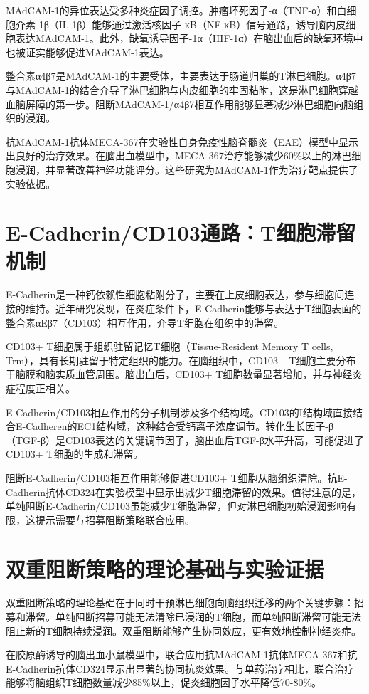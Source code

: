 \documentclass[12pt,a4paper]{article}
\begin{document}
MAdCAM-1的异位表达受多种炎症因子调控。肿瘤坏死因子-α（TNF-α）和白细胞介素-1β（IL-1β）能够通过激活核因子-κB（NF-κB）信号通路，诱导脑内皮细胞表达MAdCAM-1。此外，缺氧诱导因子-1α（HIF-1α）在脑出血后的缺氧环境中也被证实能够促进MAdCAM-1表达。

整合素α4β7是MAdCAM-1的主要受体，主要表达于肠道归巢的T淋巴细胞。α4β7与MAdCAM-1的结合介导了淋巴细胞与内皮细胞的牢固粘附，这是淋巴细胞穿越血脑屏障的第一步。阻断MAdCAM-1/α4β7相互作用能够显著减少淋巴细胞向脑组织的浸润。

抗MAdCAM-1抗体MECA-367在实验性自身免疫性脑脊髓炎（EAE）模型中显示出良好的治疗效果。在脑出血模型中，MECA-367治疗能够减少60\%以上的淋巴细胞浸润，并显著改善神经功能评分。这些研究为MAdCAM-1作为治疗靶点提供了实验依据。

\section{E-Cadherin/CD103通路：T细胞滞留机制}
E-Cadherin是一种钙依赖性细胞粘附分子，主要在上皮细胞表达，参与细胞间连接的维持。近年研究发现，在炎症条件下，E-Cadherin能够与表达于T细胞表面的整合素αEβ7（CD103）相互作用，介导T细胞在组织中的滞留。

CD103+ T细胞属于组织驻留记忆T细胞（Tissue-Resident Memory T cells, Trm），具有长期驻留于特定组织的能力。在脑组织中，CD103+ T细胞主要分布于脑膜和脑实质血管周围。脑出血后，CD103+ T细胞数量显著增加，并与神经炎症程度正相关。

E-Cadherin/CD103相互作用的分子机制涉及多个结构域。CD103的I结构域直接结合E-Cadheren的EC1结构域，这种结合受钙离子浓度调节。转化生长因子-β（TGF-β）是CD103表达的关键调节因子，脑出血后TGF-β水平升高，可能促进了CD103+ T细胞的生成和滞留。

阻断E-Cadherin/CD103相互作用能够促进CD103+ T细胞从脑组织清除。抗E-Cadherin抗体CD324在实验模型中显示出减少T细胞滞留的效果。值得注意的是，单纯阻断E-Cadherin/CD103虽能减少T细胞滞留，但对淋巴细胞初始浸润影响有限，这提示需要与招募阻断策略联合应用。

\section{双重阻断策略的理论基础与实验证据}
双重阻断策略的理论基础在于同时干预淋巴细胞向脑组织迁移的两个关键步骤：招募和滞留。单纯阻断招募可能无法清除已浸润的T细胞，而单纯阻断滞留可能无法阻止新的T细胞持续浸润。双重阻断能够产生协同效应，更有效地控制神经炎症。

在胶原酶诱导的脑出血小鼠模型中，联合应用抗MAdCAM-1抗体MECA-367和抗E-Cadherin抗体CD324显示出显著的协同抗炎效果。与单药治疗相比，联合治疗能够将脑组织T细胞数量减少85\%以上，促炎细胞因子水平降低70-80\%。
\end{document}
